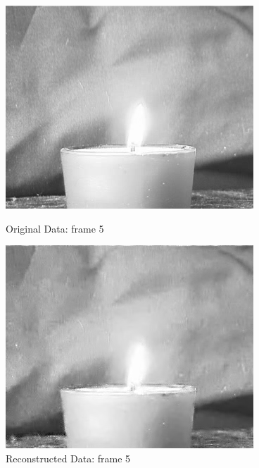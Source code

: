 \documentclass[12pt]{article}
\begin{document}
\begin{itemize}
\begin{enumerate}
    \begin{figure}[H]
        \centering
        \begin{minipage}{.45\textwidth}
            \centering
            \includegraphics[width=\linewidth]{results/flame_5_orig_5.png}
            \caption*{Original Data: frame 5}
        \end{minipage}
        \begin{minipage}{.45\textwidth}
            \centering
            \includegraphics[width=\linewidth]{results/flame_5_recon_5.png}
            \caption*{Reconstructed Data: frame 5}
        \end{minipage}
    \end{figure}

\end{enumerate}


\end{itemize}
\end{document}
